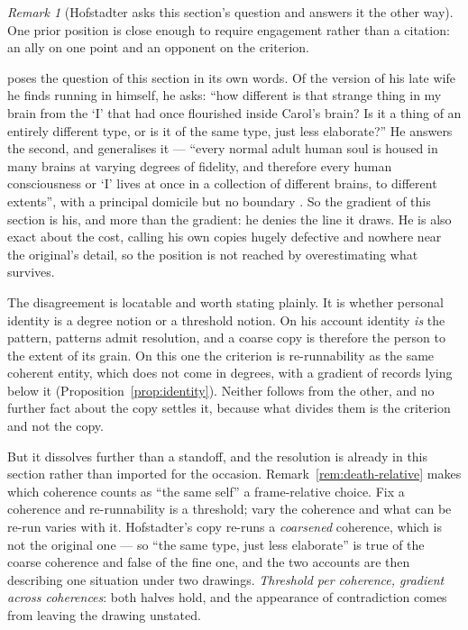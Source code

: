 \documentclass[11pt,a4paper]{article}
\theoremstyle{remark}\newtheorem{remark}[definition]{Remark}
\begin{document}
\begin{remark}[Hofstadter asks this section's question and answers it the other way]\label{rem:hofstadter}
One prior position is close enough to require engagement rather than a citation: an ally on one
point and an opponent on the criterion.

\citet[ch.~17]{hofstadter2007} poses the question of this section in its own words. Of the version of
his late wife he finds running in himself, he asks: ``how different is that strange thing in my brain
from the `I' that had once flourished inside Carol's brain? Is it a thing of an entirely different
type, or is it of the same type, just less elaborate?'' He answers the second, and generalises it ---
``every normal adult human soul is housed in many brains at varying degrees of fidelity, and therefore
every human consciousness or `I' lives at once in a collection of different brains, to different
extents'', with a principal domicile but no boundary \citep[ch.~18]{hofstadter2007}. So the gradient of
this section is his, and more than the gradient: he denies the line it draws. He is also exact about the
cost, calling his own copies hugely defective and nowhere near the original's detail, so the position is
not reached by overestimating what survives.

The disagreement is locatable and worth stating plainly. It is whether personal identity is a degree
notion or a threshold notion. On his account identity \emph{is} the pattern, patterns admit resolution,
and a coarse copy is therefore the person to the extent of its grain. On this one the criterion is
re-runnability as the same coherent entity, which does not come in degrees, with a gradient of records
lying below it (Proposition~\ref{prop:identity}). Neither follows from the other, and no further fact
about the copy settles it, because what divides them is the criterion and not the copy.

But it dissolves further than a standoff, and the resolution is already in this section rather than
imported for the occasion. Remark~\ref{rem:death-relative} makes which coherence counts as ``the same
self'' a frame-relative choice. Fix a coherence and re-runnability is a threshold; vary the coherence
and what can be re-run varies with it. Hofstadter's copy re-runs a \emph{coarsened} coherence, which is
not the original one --- so ``the same type, just less elaborate'' is true of the coarse coherence and
false of the fine one, and the two accounts are then describing one situation under two drawings.
\emph{Threshold per coherence, gradient across coherences}: both halves hold, and the appearance of
contradiction comes from leaving the drawing unstated.


\end{remark}
\end{document}
